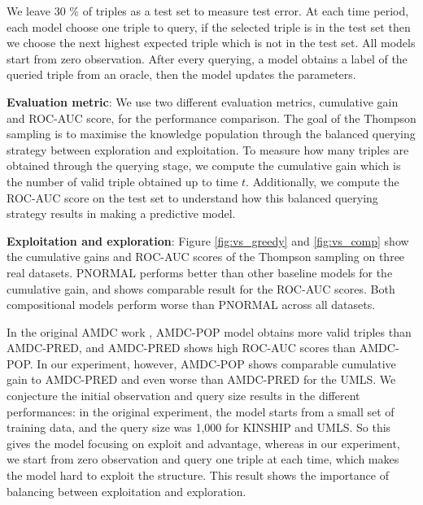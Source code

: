 We leave 30 \% of triples as a test set to measure test error. 
At each time period, each model choose one triple to query, 
if the selected triple is in the test set then we choose the next highest expected triple which is not in the test set.
All models start from zero observation. 
After every querying, a model obtains a label of the queried triple from an oracle,
then the model updates the parameters. 

\textbf{Evaluation metric}: We use two different evaluation metrics, cumulative gain and ROC-AUC score,
for the performance comparison. The goal of the Thompson sampling is to maximise the knowledge 
population through the balanced querying strategy between exploration and exploitation. 
To measure how many triples are obtained through the querying stage, we compute the cumulative 
gain which is the number of valid triple obtained up to time $t$. Additionally, we compute the ROC-AUC score on 
the test set to understand how this balanced querying strategy results in making a predictive model.

\textbf{Exploitation and exploration}: 
Figure \ref{fig:vs_greedy} and \ref{fig:vs_comp} show
the cumulative gains and ROC-AUC scores of the Thompson sampling on three real datasets.
PNORMAL performs better than other baseline models for the cumulative gain, and shows comparable result for the ROC-AUC scores. Both compositional models perform worse than PNORMAL across all datasets.

In the original AMDC work \cite{kajino2015active}, AMDC-POP model obtains more 
valid triples than AMDC-PRED, and AMDC-PRED shows high ROC-AUC scores than AMDC-POP. 
In our experiment, however, AMDC-POP shows comparable cumulative gain to AMDC-PRED 
and even worse than AMDC-PRED for the UMLS. We conjecture the initial observation and query size results in the different performances: in the original experiment, the model starts
from a small set of training data, and the query size was 1,000 for KINSHIP and UMLS. So this gives the model focusing on exploit and advantage, 
whereas in our experiment, we start from zero 
observation and query one triple at each time, which makes the model hard to exploit the structure. This result shows 
the importance of balancing between exploitation and exploration.

